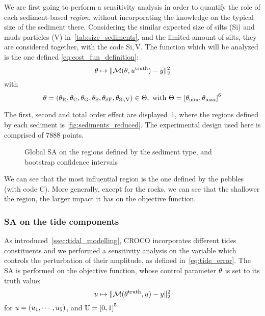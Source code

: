\documentclass[../../Main_ManuscritThese.tex]{subfiles}
\newcommand{\CROCO}{CROCO}
\newcommand\imgpath{/home/victor/acadwriting/Manuscrit/Text/Chapter5/img/}
\begin{document}
We are first going to perform a sensitivity analysis in order to
quantify the role of each sediment-based \emph{region}, without
incorporating the knowledge on the typical size of the sediment there.
Considering the similar expected size of silts (Si) and muds particles
(V) in~\cref{tab:size_sediments}, and the limited amount of silts,
they are considered together, with the code $\mathrm{Si,V}$.
The function which will be analyzed is the one defined
\cref{eq:cost_fun_definition}:
\begin{equation}
\theta \mapsto \|\mathcal{M}(\theta, u^{\mathrm{truth}}) - y \|_2^2
\end{equation}
with
\begin{equation}
  \kk = (\kk_{\mathrm{R}},\kk_{\mathrm{C}},\kk_{\mathrm{G}},\kk_{\mathrm{S}},
  \kk_{\mathrm{SF}},\kk_{\mathrm{Si,V}})\in\Kspace, \text{ with }
  \Kspace = \interval{\kk_{\min}}{\kk_{\max}}^6
\end{equation}

The first, second and total order effect are
displayed~\cref{fig:SA_sediments}, where the regions defined by each
sediment is \cref{fig:sediments_reduced}. The experimental design used
here is comprised of \num{7888} points.

\label{ssec:SA_sediments}
\begin{figure}[ht]
  \centering
  
  \caption{\label{fig:SA_sediments} Global SA on the regions defined by the sediment type, and bootstrap confidence intervals}
\end{figure}

We can see that the most influential region is the one defined by the
pebbles (with code C). More generally, except for the rocks, we can
see that the shallower the region, the larger impact it has on the
objective function. 


\subsubsection{SA on the tide components}
\label{ssec:SA_tide}
As introduced~\cref{ssec:tidal_modelling}, \CROCO{} incorporates
different tides constituents and we performed a sensitivity analysis
on the variable which controls the perturbation of their amplitude, as
defined in~\cref{eq:tide_error}. The SA is performed on the objective function, whose control parameter $\theta$ is set to its truth value:
\begin{equation}
  u \mapsto  \| \mathcal{M}(\theta^{\mathrm{truth}}, u) - y \|_2^2
\end{equation}
for $u = (u_1,\cdots,u_5)$, and $\Uspace = \interval{0}{1}^5$
\end{document}
